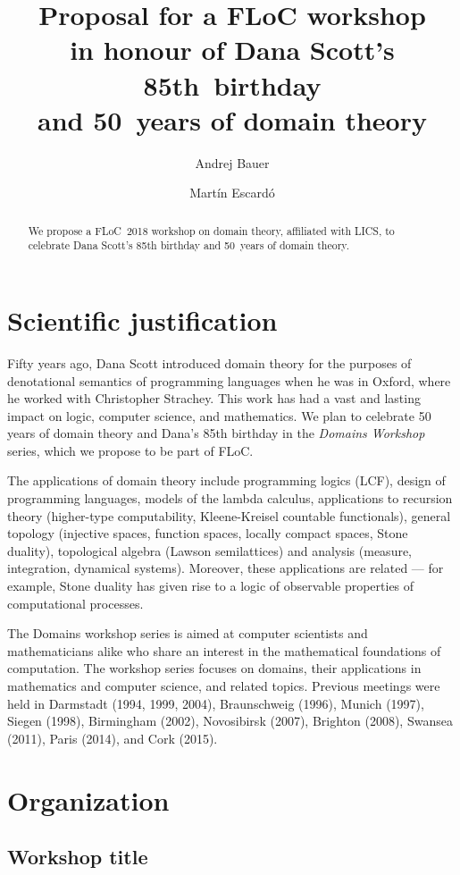 \documentclass{article}
\title{Proposal for a FLoC workshop \\
  in honour of Dana Scott's 85th~birthday \\
  and 50~years of domain theory}
\author{Andrej Bauer \and Martín Escardó}
\date{}
\begin{document}
\maketitle

\begin{abstract}
  We propose a FLoC~2018 workshop on domain theory, affiliated with LICS, to celebrate Dana Scott's 85th birthday and 50~years of domain theory.
\end{abstract}

\section{Scientific justification}

Fifty years ago, Dana Scott introduced domain theory for the purposes
of denotational semantics of programming languages when he was in
Oxford, where he worked with Christopher Strachey. This work has had a
vast and lasting impact on logic, computer science, and
mathematics. We plan to celebrate 50 years of domain theory and Dana's
85th birthday in the \emph{Domains Workshop} series, which we propose
to be part of FLoC.

The applications of domain theory include programming logics (LCF),
design of programming languages, models of the lambda calculus,
applications to recursion theory (higher-type computability,
Kleene-Kreisel countable functionals), general topology (injective
spaces, function spaces, locally compact spaces, Stone duality),
topological algebra (Lawson semilattices) and analysis (measure,
integration, dynamical systems). Moreover, these applications are
related --- for example, Stone duality has given rise to a logic of
observable properties of computational processes.

The Domains workshop series is aimed at computer scientists and
mathematicians alike who share an interest in the mathematical
foundations of computation. The workshop series focuses on domains,
their applications in mathematics and computer science, and related
topics.  Previous meetings were held in Darmstadt (1994, 1999, 2004),
Braunschweig (1996), Munich (1997), Siegen (1998), Birmingham (2002),
Novosibirsk (2007), Brighton (2008), Swansea (2011), Paris (2014), and
Cork (2015).

\section{Organization}

\subsection{Workshop title}
\end{document}
